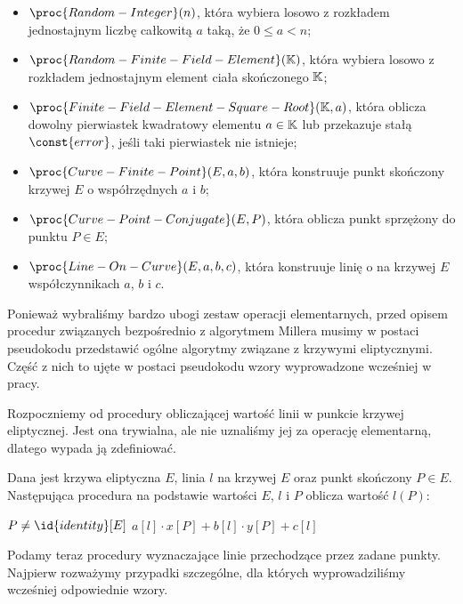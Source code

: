 \begin{remark}
\begin{itemize}
\begin{itemize}
\item $\proc{Random-Integer}(n)$, 
która wybiera losowo z rozkładem jednostajnym
liczbę całkowitą $a$ taką, że $0 \leq a < n$;
\item $\proc{Random-Finite-Field-Element}(\K)$,
która wybiera losowo z rozkładem jednostajnym
element ciała skończonego $\mathbb{K}$;
\item $\proc{Finite-Field-Element-Square-Root}(\K, a)$,
która oblicza
dowolny pierwiastek kwadratowy elementu $a \in \mathbb{K}$
lub przekazuje stałą $\const{error}$, jeśli taki pierwiastek nie istnieje;
\item $\proc{Curve-Finite-Point}(E, a, b)$,
która konstruuje
punkt skończony krzywej $E$ o współrzędnych $a$ i $b$;
\item $\proc{Curve-Point-Conjugate}(E, P)$,
która oblicza
punkt sprzężony do punktu $P \in E$;
\item $\proc{Line-On-Curve}(E, a, b, c)$,
która konstruuje
linię o na krzywej $E$ współczynnikach $a$, $b$ i $c$.
\end{itemize}
\end{itemize}
\end{remark}

\noindent
Ponieważ wybraliśmy bardzo ubogi zestaw operacji elementarnych,
przed opisem procedur związanych bezpośrednio z algorytmem Millera
musimy w postaci pseudokodu przedstawić
ogólne algorytmy związane z krzywymi eliptycznymi.
Część z nich to ujęte w postaci pseudokodu
wzory wyprowadzone wcześniej w pracy.

\noindent
Rozpoczniemy od procedury obliczającej
wartość linii w punkcie krzywej eliptycznej.
Jest ona trywialna, ale nie uznaliśmy jej za operację elementarną,
dlatego wypada ją zdefiniować.

\begin{algorithm}
Dana jest krzywa eliptyczna $E$,
linia $l$ na krzywej $E$ oraz punkt skończony $P \in E$.
Następująca procedura
na podstawie wartości $E$, $l$ i $P$
oblicza
wartość $l(P)$:

\begin{codebox}
\li
    \Assert $P \neq \id{identity}[E]$
\li
    \Return $a[l]\cdot x[P] + b[l]\cdot y[P] + c[l]$
\end{codebox}
\end{algorithm}

\noindent
Podamy teraz procedury wyznaczające linie przechodzące przez zadane punkty.
Najpierw rozważymy przypadki szczególne,
dla których wyprowadziliśmy wcześniej odpowiednie wzory.

